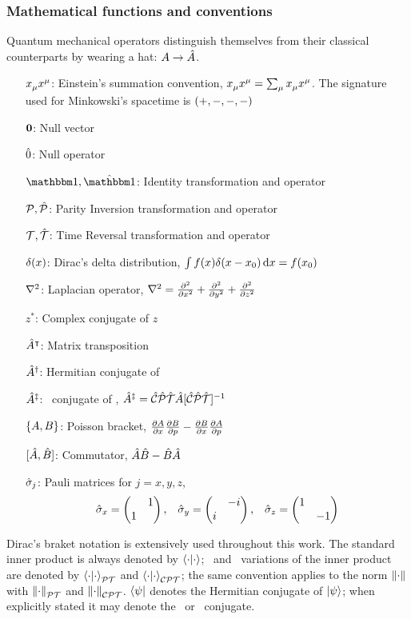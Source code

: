 \subsubsection{Mathematical functions and conventions}
Quantum mechanical operators distinguish themselves from their classical counterparts by wearing a hat: $A \to \hat{A}$.
\begin{enumerate}
    \item[$\tensor{x}{_\mu}\tensor{x}{^\mu}$:] Einstein's summation convention, $\tensor{x}{_\mu}\tensor{x}{^\mu} = \sum\nolimits_\mu \tensor{x}{_\mu}\tensor{x}{^\mu}$. The signature used for Minkowski's spacetime is $\pqty{+,-, -, -}$
    \item[$\vb{0}$:] Null vector
    \item[$\hat{0}$:] Null operator 
    \item[$\idM,\hidM$:] Identity transformation and operator
    \item[$\mathcal{P},\mathcal{\hat{P}}$:] Parity Inversion transformation and operator  
    \item[$\mathcal{T},\mathcal{\hat{T}}$:] Time Reversal transformation and operator
    \item[$\delta\pqty{x}$:] Dirac's delta distribution, $\int{f\pqty{x}\delta\pqty{x-x_0}\dd{x}} = f\pqty{x_0}$
    \item[$\laplacian$:] Laplacian operator, $\laplacian = \pdv[2]{x} + \pdv[2]{y} + \pdv[2]{z}$ 
    \item[$z^*$:] Complex conjugate of $z$
    \item[$\hat{A}^\intercal$:] Matrix transposition
    \item[$\hat{A}^\dag$:] Hermitian conjugate of \hA
    \item[$\hat{A}^\ddag$:] \CPT\ conjugate of \hA, $\hA^\ddag = \CPTtransform{\hA}$
    \item[$\acomm*{A}{B}\!$:] Poisson bracket, $\pdv{A}{x}\pdv{B}{p} - \pdv{B}{x}\pdv{A}{p}$
    \item[$\comm*{\hA}{\hB}\!$:] Commutator, $\hat{A}\hat{B} - \hat{B}\hat{A}$  
    \item[$\hat{\sigma}_j$:] Pauli matrices for $j=x,y,z$,
        \begin{equation*}
            \togglehat{\sigma}_x = \pmqty{\admat{1,1}}
            \mycomma \quad
            \togglehat{\sigma}_y = \pmqty{\admat{-i,i}}
            \mycomma \quad
            \togglehat{\sigma}_z = \pmqty{\dmat{1,-1}}
        \end{equation*} 
\end{enumerate}
Dirac's braket notation is extensively used throughout this work. The standard inner product is always denoted by $\bra{\cdot}\ket{\cdot}$; \PT\ and \CPT\ variations of the inner product are denoted by $\braket{\cdot}{\cdot}_{\mathcal{P}\mathcal{T}}$ and $\braket{\cdot}{\cdot}_{\mathcal{C}\mathcal{P}\mathcal{T}}$; the same convention applies to the norm $\norm{\cdot}$ with $\norm{\cdot}_{\mathcal{P}\mathcal{T}}$ and $\norm{\cdot}_{\mathcal{C}\mathcal{P}\mathcal{T}}$. $\bra{\psi}$ denotes the Hermitian conjugate of $\ket{\psi}$; when explicitly stated it may denote the \PT\ or \CPT\ conjugate.